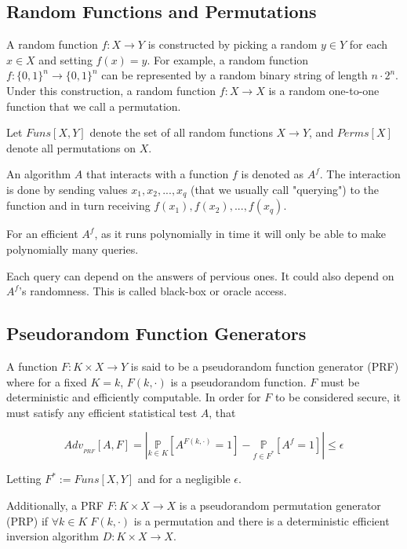 \documentclass{article}
\begin{document}
\begin{multicols}{2}
\section{Random Functions and Permutations}

A random function $f: X \rightarrow Y$ is constructed by picking a random $y \in Y$ for each $x \in X$ and setting $f(x) = y$. For example, a random function $f: \{0,1\}^n \rightarrow \{0,1\}^n$ can be represented by a random binary string of length $n \cdot 2^n$. Under this construction, a random function $f: X \rightarrow X$ is a random one-to-one function that we call a permutation.

Let $Funs[X,Y]$ denote the set of all random functions $X \rightarrow Y$, and $Perms[X]$ denote all permutations on $X$.

An algorithm $A$ that interacts with a function $f$ is denoted as $A^f$. The interaction is done by sending values $x_1, x_2, ..., x_q$ (that we usually call "querying") to the function and in turn receiving $f(x_1), f(x_2), ..., f(x_q)$.

For an efficient $A^f$, as it runs polynomially in time it will only be able to make polynomially many queries. 

Each query can depend on the answers of pervious ones. It could also depend on $A^f$'s randomness. This is called black-box or oracle access.

\subsection{Pseudorandom Function Generators}

A function $F: K \times X \rightarrow Y$ is said to be a pseudorandom function generator (PRF) where for a fixed $K = k$, $F(k,\cdot)$ is a pseudorandom function. $F$ must be deterministic and efficiently computable. In order for $F$ to be considered secure, it must satisfy any efficient statistical test $A$, that

$$
Adv_{_{PRF}}[A,F] = \left |\underset{k \in K}{\mathbb{P}}[A^{F(k, \cdot)} = 1] - \underset{f \in F^*}{\mathbb{P}}[A^{f} = 1] \right| \leq \epsilon
$$

Letting $F^* := Funs[X,Y]$ and for a negligible $\epsilon$.

Additionally, a PRF $F: K \times X \rightarrow X$ is a pseudorandom permutation generator (PRP) if $\forall k \in K\; F(k, \cdot)$ is a permutation and there is a deterministic efficient inversion algorithm $D: K \times X \rightarrow X$.


\end{multicols}
\end{document}
